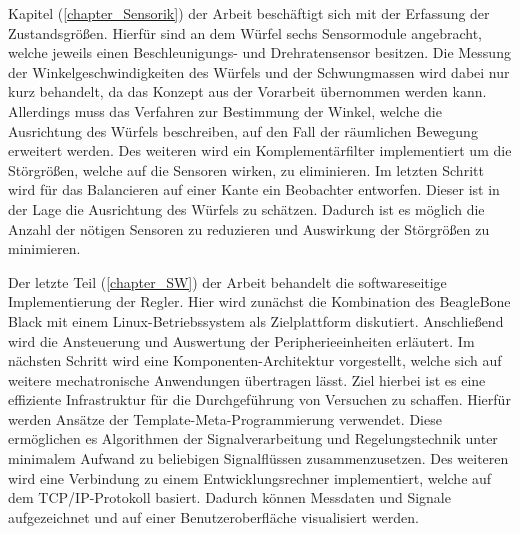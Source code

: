 Kapitel (\ref{chapter_Sensorik}) der Arbeit beschäftigt sich mit der Erfassung der Zustandsgrößen. Hierfür sind an dem Würfel sechs Sensormodule angebracht, welche jeweils einen Beschleunigungs- und Drehratensensor besitzen. Die Messung der Winkelgeschwindigkeiten des Würfels und der Schwungmassen wird dabei nur kurz behandelt, da das Konzept aus der Vorarbeit übernommen werden kann. Allerdings muss das Verfahren zur Bestimmung der Winkel, welche die Ausrichtung des Würfels beschreiben, auf den Fall der räumlichen Bewegung erweitert werden. Des weiteren wird ein Komplementärfilter implementiert um die Störgrößen, welche auf die Sensoren wirken, zu eliminieren. Im letzten Schritt wird für das Balancieren auf einer Kante ein Beobachter entworfen. Dieser ist in der Lage die Ausrichtung des Würfels zu schätzen. Dadurch ist es möglich die Anzahl der nötigen Sensoren zu reduzieren und Auswirkung der Störgrößen zu minimieren.

Der letzte Teil (\ref{chapter_SW}) der Arbeit behandelt die softwareseitige Implementierung der Regler. Hier wird zunächst die Kombination des BeagleBone Black mit einem Linux-Betriebssystem als Zielplattform diskutiert. Anschließend wird die Ansteuerung und Auswertung der Peripherieeinheiten erläutert. Im nächsten Schritt wird eine Komponenten-Architektur vorgestellt, welche sich auf weitere mechatronische Anwendungen übertragen lässt. Ziel hierbei ist es eine effiziente Infrastruktur für die Durchgeführung von Versuchen zu schaffen. Hierfür werden Ansätze der Template-Meta-Programmierung verwendet. Diese ermöglichen es Algorithmen der Signalverarbeitung und Regelungstechnik unter minimalem Aufwand zu beliebigen Signalflüssen zusammenzusetzen. Des weiteren wird eine Verbindung zu einem Entwicklungsrechner implementiert, welche auf dem TCP/IP-Protokoll basiert. Dadurch können Messdaten und Signale aufgezeichnet und auf einer Benutzeroberfläche visualisiert werden.
